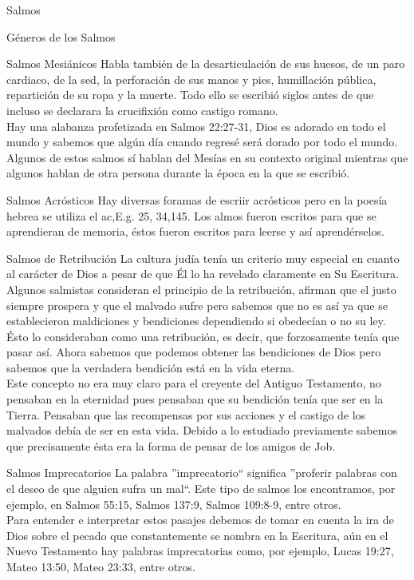 \begin{section}{Salmos}
\begin{subsection}{Géneros de los Salmos}
\begin{subsubsection}{Salmos Mesiánicos}
			Habla también de la desarticulación de sus huesos, de un paro cardiaco, de la sed, la perforación de sus manos y pies, humillación pública, repartición de su ropa y la muerte. Todo ello se escribió siglos antes de que incluso se declarara la crucifixión como castigo romano.\\
			Hay una alabanza profetizada en Salmos 22:27-31, Dios es adorado en todo el mundo y sabemos que algún día cuando regresé será dorado por todo el mundo. Algunos de estos salmos sí hablan del Mesías en su contexto original mientras que algunos hablan de otra persona durante la época en la que se escribió.  
		\end{subsubsection}
		\begin{subsubsection}{Salmos Acrósticos}
			Hay diversas foramas de escriir acrósticos pero en la poesía hebrea se utiliza el ac,E.g. 25, 34,145. Los almos fueron escritos para que se aprendieran de memoria, éstos fueron escritos para leerse y así aprendérselos.
		\end{subsubsection}
		\begin{subsubsection}{Salmos de Retribución}
			La cultura judía tenía un criterio muy especial en cuanto al carácter de Dios a pesar de que Él lo ha revelado claramente en Su Escritura. Algunos salmistas consideran el principio de la retribución, afirman que el justo siempre prospera y que el malvado sufre pero sabemos que no es así ya que se establecieron maldiciones y bendiciones dependiendo si obedecían o no su ley. Ésto lo consideraban como una retribución, es decir, que forzosamente tenía que pasar así. Ahora sabemos que podemos obtener las bendiciones de Dios pero sabemos que la verdadera bendición está en la vida eterna.\\
			Este concepto no era muy claro para el creyente del Antiguo Testamento, no pensaban en la eternidad pues pensaban que su bendición tenía que ser en la Tierra. Pensaban que las recompensas por sus acciones y el castigo de los malvados debía de ser en esta vida. Debido a lo estudiado previamente sabemos que precisamente ésta era la forma de pensar de los amigos de Job.
		\end{subsubsection}
		\newpage
		\begin{subsubsection}{Salmos Imprecatorios}
			La palabra ''imprecatorio`` significa ''proferir palabras con el deseo de que alguien sufra un mal``. Este tipo de salmos los encontramos, por ejemplo, en Salmos 55:15, Salmos 137:9, Salmos 109:8-9, entre otros.\\
			Para entender e interpretar estos pasajes debemos de tomar en cuenta la ira de Dios sobre el pecado que constantemente se nombra en la Escritura, aún en el Nuevo Testamento hay palabras imprecatorias como, por ejemplo, Lucas 19:27, Mateo 13:50, Mateo 23:33, entre otros.\\

\end{subsubsection}
\end{subsection}
\end{section}
